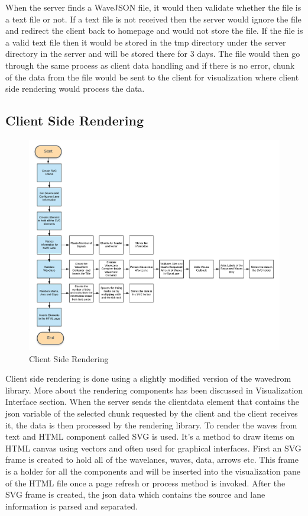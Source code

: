 \documentclass[14pt]{extarticle}
\begin{document}
\par When the server finds a WaveJSON file, it would then validate whether the file is a text file or not. If a text file is not received then the server would ignore the file and redirect the client back to homepage and would not store the file. If the file is a valid text file then it would be stored in the tmp directory under the server directory in the server and will be stored there for 3 days. The file would then go through the same process as client data handling and if there is no error, chunk of the data from the file would be sent to the client for visualization where client side rendering would process the data.


\subsection{Client Side Rendering}
\begin{figure}[H]
    \centering
    \includegraphics[scale=0.23]{render}
    \caption{Client Side Rendering}
    \label{fig:Client Side Rendering}
\end{figure}
Client side rendering is done using a slightly modified version of the wavedrom library. More about the rendering components has been discussed in Visualization Interface section.
When the server sends the clientdata element that contains the json variable of the selected chunk requested by the client and the client receives it, the data is then processed by the rendering library. To render the waves from text and HTML component called SVG is used. It's a method to draw items on HTML canvas using vectors and often used for graphical interfaces. First an SVG frame is created to hold all of the wavelanes, waves, data, arrows etc. This frame is a holder for all the components and will be inserted into the visualization pane of the HTML file once a page refresh or process method is invoked. After the SVG frame is created, the json data which contains the source and lane information is parsed and separated. 
\end{document}
